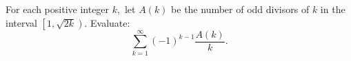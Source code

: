 For each positive integer $k,$ let $A(k)$ be the number of odd divisors of $k$ in the interval $\left[1,\sqrt{2k}\right).$ Evaluate: \[\sum_{k=1}^{\infty}(-1)^{k-1}\frac{A(k)}k.\]